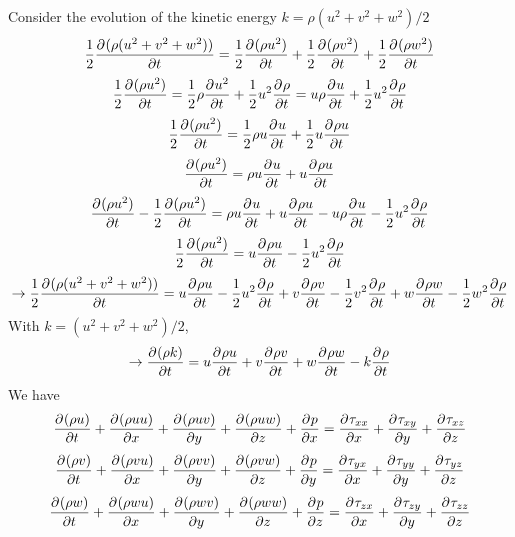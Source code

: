 \documentclass[12pt]{article}
\numberwithin{equation}{section}
\numberwithin{figure}{section}
\begin{document}
Consider the evolution of the kinetic energy $k = \rho (u^2 + v^2 + w^2)/2$
\begin{equation}
\frac{1}{2}\pdv{(\rho (u^2 + v^2 + w^2))}{t} = \frac{1}{2}\pdv{(\rho u^2)}{t} + \frac{1}{2}\pdv{(\rho v^2)}{t} + \frac{1}{2}\pdv{(\rho w^2)}{t}
\end{equation}
\begin{equation}
\frac{1}{2}\pdv{(\rho u^2)}{t} = \frac{1}{2}\rho\pdv{u^2}{t} + \frac{1}{2}u^2\pdv{\rho}{t} = u\rho\pdv{u}{t} + \frac{1}{2}u^2\pdv{\rho}{t}
\end{equation}
\begin{equation}
\frac{1}{2}\pdv{(\rho u^2)}{t} = \frac{1}{2}\rho u\pdv{u}{t} + \frac{1}{2}u\pdv{\rho u}{t}
\end{equation}
\begin{equation}
\pdv{(\rho u^2)}{t} = \rho u\pdv{u}{t} + u\pdv{\rho u}{t}
\end{equation}
\begin{equation}
\pdv{(\rho u^2)}{t} - \frac{1}{2}\pdv{(\rho u^2)}{t} = \rho u\pdv{u}{t} + u\pdv{\rho u}{t} - u\rho\pdv{u}{t} - \frac{1}{2}u^2\pdv{\rho}{t}
\end{equation}
\begin{equation}
\frac{1}{2}\pdv{(\rho u^2)}{t} = u\pdv{\rho u}{t} - \frac{1}{2}u^2\pdv{\rho}{t}
\end{equation}
\begin{equation}
\to \frac{1}{2}\pdv{(\rho (u^2 + v^2 + w^2))}{t} = u\pdv{\rho u}{t} - \frac{1}{2}u^2\pdv{\rho}{t} + v\pdv{\rho v}{t} - \frac{1}{2}v^2\pdv{\rho}{t} + w\pdv{\rho w}{t} - \frac{1}{2}w^2\pdv{\rho}{t}
\end{equation}
With $k = (u^2 + v^2 + w^2)/2$,
\begin{equation}
\to \pdv{(\rho k)}{t} = u\pdv{\rho u}{t} + v\pdv{\rho v}{t} + w\pdv{\rho w}{t} - k \pdv{\rho}{t}
\end{equation}
We have
\begin{equation}
\pdv{(\rho u)}{t} + \pdv{(\rho u u)}{x} + \pdv{(\rho u v)}{y} + \pdv{(\rho u w)}{z} + \pdv{p}{x} = \pdv{\tau_{xx}}{x} + \pdv{\tau_{xy}}{y} + \pdv{\tau_{xz}}{z}
\end{equation}
\begin{equation}
\pdv{(\rho v)}{t} + \pdv{(\rho v u)}{x} + \pdv{(\rho v v)}{y} + \pdv{(\rho v w)}{z} + \pdv{p}{y} = \pdv{\tau_{yx}}{x} + \pdv{\tau_{yy}}{y} + \pdv{\tau_{yz}}{z}
\end{equation}
\begin{equation}
\pdv{(\rho w)}{t} + \pdv{(\rho w u)}{x} + \pdv{(\rho w v)}{y} + \pdv{(\rho w w)}{z} + \pdv{p}{z} = \pdv{\tau_{zx}}{x} + \pdv{\tau_{zy}}{y} + \pdv{\tau_{zz}}{z}
\end{equation}
\end{document}
